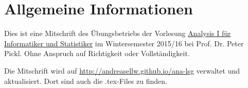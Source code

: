 \chapter*{Allgemeine Informationen}
Dies ist eine Mitschrift des Übungsbetriebs der Vorlesung
\href{http://www.mathematik.uni-muenchen.de/~nissen/analysis2015/}{Analysis I für Informatiker und Statistiker}
im Wintersemester 2015/16 bei Prof. Dr. Peter Pickl. Ohne Anspruch auf Richtigkeit oder Vollständigkeit.\par
Die Mitschrift wird auf \href{http://andreasellw.github.io/ana-lsg}{http://andreasellw.github.io/ana-lsg} verwaltet und aktualisiert. Dort sind auch die .tex-Files zu finden.
